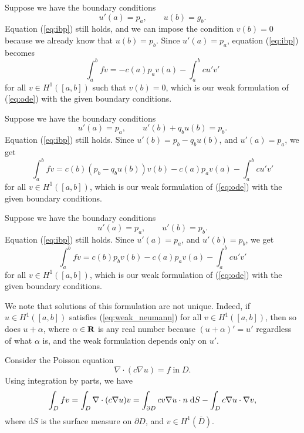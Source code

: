 \documentclass{homework}
\begin{document}
	\begin{alphaparts}
		\questionpart Suppose we have the boundary conditions
		\begin{equation}
			u'(a) = p_a, \qquad u(b) = g_b.
		\end{equation}
		Equation (\ref{eq:ibp}) still holds, and we can impose the condition $v(b) = 0$ because we already know that $u(b) = p_b$. Since $u'(a) = p_a$, equation (\ref{eq:ibp}) becomes
		\begin{equation}
			\int_a^b fv = -c(a)p_av(a) - \int_a^bcu'v'
		\end{equation}
		for all $v \in H^1([a,b])$ such that $v(b) = 0$, which is our weak formulation of (\ref{eq:ode}) with the given boundary conditions.
		
		\questionpart Suppose we have the boundary conditions
		\begin{equation}
			u'(a) = p_a, \qquad u'(b) + q_bu(b) = p_b.
		\end{equation}
		Equation (\ref{eq:ibp}) still holds. Since $u'(b) = p_b - q_bu(b)$, and $u'(a) = p_a$, we get
		\begin{equation}
			\int_a^bfv = c(b)(p_b - q_bu(b))v(b) - c(a)p_av(a) - \int_a^bcu'v'
		\end{equation}
		for all $v \in H^1([a,b])$, which is our weak formulation of (\ref{eq:ode}) with the given boundary conditions.
		
		\questionpart Suppose we have the boundary conditions
		\begin{equation}
 			u'(a) = p_a,\qquad u'(b) = p_b.
		\end{equation}
		Equation (\ref{eq:ibp}) still holds. Since $u'(a) = p_a$, and $u'(b) = p_b$, we get
		\begin{equation}
			\label{eq:weak_neumann}
			\int_a^bfv = c(b)p_bv(b) - c(a)p_av(a) - \int_a^bcu'v'
		\end{equation}
		for all $v \in H^1([a,b])$, which is our weak formulation of (\ref{eq:ode}) with the given boundary conditions.
		
		We note that solutions of this formulation are not unique. Indeed, if $u \in H^1([a,b])$ satisfies (\ref{eq:weak_neumann}) for all $v \in H^1([a,b])$, then so does $u + \alpha$, where $\alpha \in \textnormal{\bf R}$ is any real number because $(u+\alpha)' = u'$ regardless of what $\alpha$ is, and the weak formulation depends only on $u'$.
	\end{alphaparts}
	
	\question Consider the Poisson equation
	\begin{equation}
		\label{eq:poisson}
		\nabla \cdot (c\nabla u) = f \; \text{in}\; D.
	\end{equation}
	Using integration by parts, we have
	\begin{equation}
		\label{eq:ibp2}
		\int_D fv = \int_D \nabla \cdot(c\nabla u)v = \int_{\partial D} cv \nabla u \cdot n \;\text{d} S - \int_D c\nabla u \cdot \nabla v,
	\end{equation}
	where $\text{d}S$ is the surface measure on $\partial D$, and $v \in H^1\left(\overline{D}\right)$.
	
\end{document}
